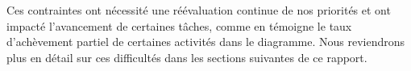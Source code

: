 Ces contraintes ont nécessité une réévaluation continue de nos priorités et ont impacté l'avancement de certaines tâches, comme en témoigne le taux d’achèvement partiel de certaines activités dans le diagramme. Nous reviendrons plus en détail sur ces difficultés dans les sections suivantes de ce rapport.


